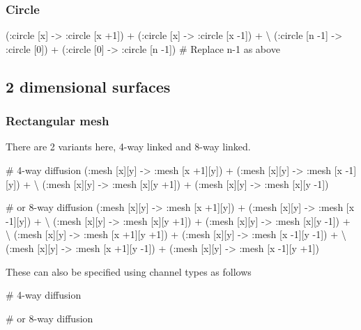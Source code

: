 \documentclass[english]{report}
\begin{document}
\subsubsection{Circle}

\begin{kappasource}
    (:circle [x] -> :circle [x +1]) + (:circle [x] -> :circle [x -1]) + {\textbackslash}
    (:circle [n -1] -> :circle [0]) + (:circle [0] -> :circle [n -1]) # Replace n-1 as above
\end{kappasource}


\subsection{2 dimensional surfaces}

\subsubsection{Rectangular mesh}

There are 2 variants here, 4-way linked and 8-way linked.

\begin{kappasource}

# 4-way diffusion
    (:mesh [x][y] -> :mesh [x +1][y]) + (:mesh [x][y] -> :mesh [x -1][y]) + {\textbackslash}
    (:mesh [x][y] -> :mesh [x][y +1]) + (:mesh [x][y] -> :mesh [x][y -1])

# or 8-way diffusion
    (:mesh [x][y] -> :mesh [x +1][y]) + (:mesh [x][y] -> :mesh [x -1][y]) + {\textbackslash}
    (:mesh [x][y] -> :mesh [x][y +1]) + (:mesh [x][y] -> :mesh [x][y -1]) + {\textbackslash}
    (:mesh [x][y] -> :mesh [x +1][y +1]) + (:mesh [x][y] -> :mesh [x -1][y -1]) + {\textbackslash}
    (:mesh [x][y] -> :mesh [x +1][y -1]) + (:mesh [x][y] -> :mesh [x -1][y +1])
\end{kappasource}

These can also be specified using channel types as follows

\begin{kappasource}

# 4-way diffusion

# or 8-way diffusion
\end{kappasource}
\end{document}

